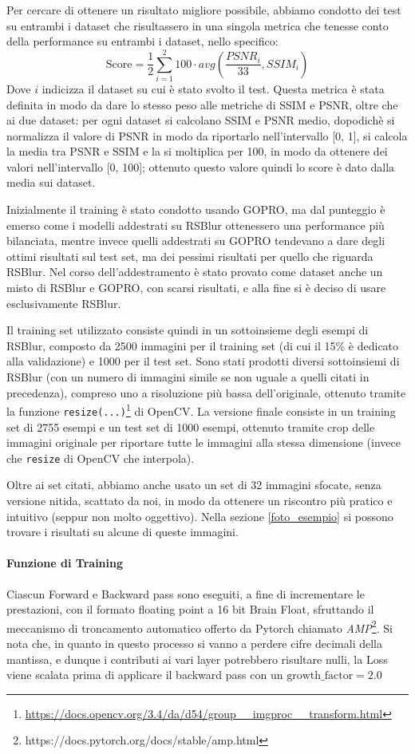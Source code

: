 \documentclass[a4paper,10pt,twocolumn]{article}
\begin{document}
Per cercare di ottenere un risultato migliore possibile, abbiamo condotto dei test su entrambi i dataset che risultassero in una singola metrica che tenesse conto della performance su entrambi
i dataset, nello specifico:
\[ \text{Score} = \frac{1}{2}\sum_{i=1}^2 100 \cdot avg(\frac{PSNR_i}{33}, SSIM_i)\]
Dove $i$ indicizza il dataset su cui è stato svolto il test. Questa metrica è stata definita in modo da dare lo stesso peso alle metriche di SSIM e PSNR, oltre che ai due dataset: per ogni dataset si calcolano SSIM e PSNR medio, dopodichè si normalizza
il valore di PSNR in modo da riportarlo nell'intervallo [0, 1], si calcola la media tra PSNR e SSIM e la si moltiplica per 100, in modo da ottenere dei valori nell'intervallo [0, 100]; ottenuto questo valore quindi lo score è dato dalla media sui dataset.

Inizialmente il training è stato condotto usando GOPRO, ma dal punteggio è emerso come i modelli addestrati su RSBlur ottenessero una performance più bilanciata, mentre invece quelli addestrati su GOPRO tendevano a dare degli ottimi risultati sul test set, ma dei pessimi
risultati per quello che riguarda RSBlur. Nel corso dell'addestramento è stato provato come dataset anche un misto di RSBlur e GOPRO, con scarsi risultati, e alla fine si è deciso di usare esclusivamente RSBlur.

Il training set utilizzato consiste quindi in un sottoinsieme degli esempi di RSBlur, composto da 2500 immagini per il training set (di cui il 15\% è dedicato alla validazione) e 1000 per il test set. Sono stati prodotti diversi sottoinsiemi di RSBlur (con un numero di immagini
simile se non uguale a quelli citati in precedenza), compreso uno a risoluzione più bassa dell'originale, ottenuto tramite la funzione \texttt{resize(...)}\footnote{\url{https://docs.opencv.org/3.4/da/d54/group__imgproc__transform.html}} di OpenCV.
La versione finale consiste in un training set di 2755 esempi e un test set di 1000 esempi, ottenuto tramite crop delle immagini originale per riportare tutte le immagini alla stessa dimensione (invece che \texttt{resize} di OpenCV che interpola).

Oltre ai set citati, abbiamo anche usato un set di 32 immagini sfocate, senza versione nitida, scattato da noi, in modo da ottenere un riscontro più pratico e intuitivo (seppur non molto oggettivo). Nella sezione \ref{foto_esempio} si possono trovare i risultati su alcune di queste immagini.

\paragraph{Funzione di Training}
Ciascun Forward e Backward pass sono eseguiti, a fine di incrementare le prestazioni, con il formato floating point a 16 bit Brain Float,
sfruttando il meccanismo di troncamento automatico offerto da Pytorch chiamato \textit{AMP}\footnote{https://docs.pytorch.org/docs/stable/amp.html}.
Si nota che, in quanto in questo processo si vanno a perdere cifre decimali della mantissa, e dunque i contributi ai vari layer potrebbero risultare nulli,
la Loss viene scalata prima di applicare il backward pass con un $\mathrm{growth\_factor} = 2.0$
\end{document}

